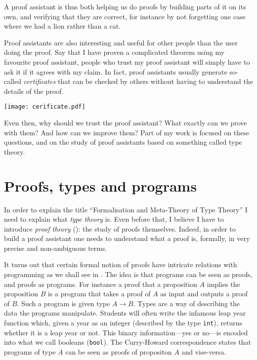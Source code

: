 A proof assistant is thus both helping us do proofs by building parts of it on
its own, and verifying that they are correct, for instance by not forgetting one
case where we had a lion rather than a cat.

Proof assistants are also interesting and useful for other people than the user
doing the proof. Say that I have proven a complicated theorem using my favourite
proof assistant, people who trust my proof assistant will simply have to ask it
if it agrees with my claim.
In fact, proof assistants usually generate so-called \emph{certificates} that
can be checked by others without having to understand the details of the proof.
\begin{center}
  \texttt{[image: cerificate.pdf]}
\end{center}

Even then, why should we trust the proof assistant? What exactly can we prove
with them? And how can we improve them?
Part of my work is focused on these questions, and on the study of proof
assistants based on something called type theory.

\section{Proofs, types and programs}

In order to explain the title ``Formalisation and Meta-Theory of Type Theory''
I need to explain what \emph{type theory} is. Even before that, I believe I have
to introduce \emph{proof theory} (): the study of proofs
themselves. Indeed, in order to build a proof assistant one needs to understand
what a proof is, formally, \ie in very precise and non-ambiguous terms.

It turns out that certain formal notion of proofs have intricate relations with
programming as we shall see in . The idea is that programs
can be seen as proofs, and proofs as programs.
For instance a proof that a proposition \(A\) implies the proposition \(B\)
is a program that takes a proof of \(A\) as input and outputs a proof of \(B\).
Such a program is given type \(A \to B\). Types are a way of describing the data
the programs manipulate. Students will often write the infamous leap year
function which, given a year as an integer (described by the type
\texttt{int}), returns whether it is a leap year or not. This binary
information---yes or no---is encoded into what we call booleans
(\texttt{bool}).
The Curry-Howard correspondence states that programs of type \(A\) can be seen
as proofs of propositon \(A\) and vise-versa.

